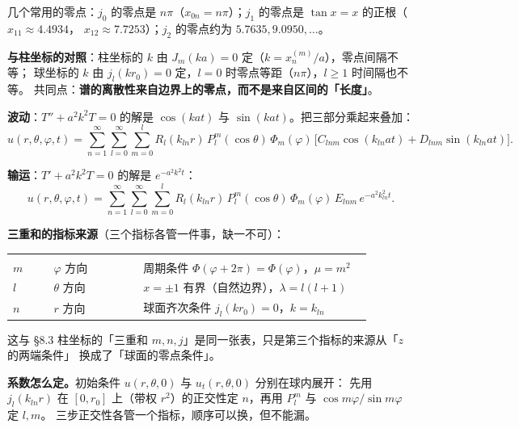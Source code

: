 几个常用的零点：$j_0$ 的零点是 $n\pi$（$x_{0n}=n\pi$）；$j_1$ 的零点是 $\tan x=x$ 的正根（$x_{11}\approx4.4934$，
$x_{12}\approx7.7253$）；$j_2$ 的零点约为 $5.7635,9.0950,\dots$。

\textbf{与柱坐标的对照}：柱坐标的 $k$ 由 $J_m(ka)=0$ 定（$k=x_n^{(m)}/a$），零点间隔不等；
球坐标的 $k$ 由 $j_l(kr_0)=0$ 定，$l=0$ 时零点等距（$n\pi$），$l\ge1$ 时间隔也不等。
共同点：\textbf{谱的离散性来自边界上的零点，而不是来自区间的「长度」}。


\textbf{波动}：$T''+a^2k^2T=0$ 的解是 $\cos(kat)$ 与 $\sin(kat)$。把三部分乘起来叠加：
\begin{equation}
u(r,\theta,\varphi,t)=\sum_{n=1}^{\infty}\sum_{l=0}^{\infty}\sum_{m=0}^{l}
R_l(k_{ln}r)\,P_l^m(\cos\theta)\,\Phi_m(\varphi)\,
\big[C_{lnm}\cos(k_{ln}at)+D_{lnm}\sin(k_{ln}at)\big] .
\label{eq:wavesol}
\end{equation}

\textbf{输运}：$T'+a^2k^2T=0$ 的解是 $e^{-a^2k^2t}$：
\begin{equation}
u(r,\theta,\varphi,t)=\sum_{n=1}^{\infty}\sum_{l=0}^{\infty}\sum_{m=0}^{l}
R_l(k_{ln}r)\,P_l^m(\cos\theta)\,\Phi_m(\varphi)\,
E_{lnm}\,e^{-a^2k_{ln}^2t} .
\label{eq:transportsol}
\end{equation}

\textbf{三重和的指标来源}（三个指标各管一件事，缺一不可）：

\begin{center}
\tabtop
\begin{tabular}{@{}L{0.10\linewidth}L{0.22\linewidth}L{0.56\linewidth}@{}}
 &  &  \\
\tabmidrule
$m$ & $\varphi$ 方向 & 周期条件 $\Phi(\varphi+2\pi)=\Phi(\varphi)$，$\mu=m^2$ \\
$l$ & $\theta$ 方向 & $x=\pm1$ 有界（自然边界），$\lambda=l(l+1)$ \\
$n$ & $r$ 方向 & 球面齐次条件 $j_l(kr_0)=0$，$k=k_{ln}$ \\
\end{tabular}
\tabbot
\end{center}

这与 §8.3 柱坐标的「三重和 $m,n,j$」是同一张表，只是第三个指标的来源从「$z$ 的两端条件」
换成了「球面的零点条件」。

\textbf{系数怎么定。}初始条件 $u(r,\theta,0)$ 与 $u_t(r,\theta,0)$ 分别在球内展开：
先用 $j_l(k_{ln}r)$ 在 $[0,r_0]$ 上（带权 $r^2$）的正交性定 $n$，再用 $P_l^m$ 与 $\cos m\varphi/\sin m\varphi$ 定 $l,m$。
三步正交性各管一个指标，顺序可以换，但不能漏。

